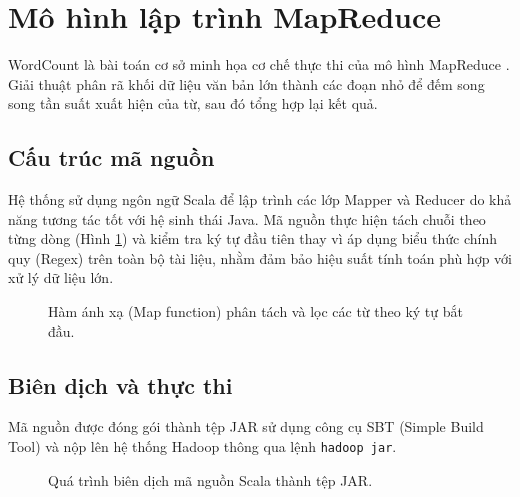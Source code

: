 \section{Mô hình lập trình MapReduce}

WordCount là bài toán cơ sở minh họa cơ chế thực thi của mô hình MapReduce \cite{dean2004mapreduce}. Giải thuật phân rã khối dữ liệu văn bản lớn thành các đoạn nhỏ để đếm song song tần suất xuất hiện của từ, sau đó tổng hợp lại kết quả.

\subsection{Cấu trúc mã nguồn}
Hệ thống sử dụng ngôn ngữ Scala để lập trình các lớp Mapper và Reducer do khả năng tương tác tốt với hệ sinh thái Java. Mã nguồn thực hiện tách chuỗi theo từng dòng (Hình \ref{fig:scala_code}) và kiểm tra ký tự đầu tiên thay vì áp dụng biểu thức chính quy (Regex) trên toàn bộ tài liệu, nhằm đảm bảo hiệu suất tính toán phù hợp với xử lý dữ liệu lớn.

\begin{figure}[H]
    \centering
    \caption{Hàm ánh xạ (Map function) phân tách và lọc các từ theo ký tự bắt đầu.}
    \label{fig:scala_code}
\end{figure}

\subsection{Biên dịch và thực thi}
Mã nguồn được đóng gói thành tệp JAR sử dụng công cụ SBT (Simple Build Tool) và nộp lên hệ thống Hadoop thông qua lệnh \texttt{hadoop jar}.

\begin{figure}[H]
    \centering
    \caption{Quá trình biên dịch mã nguồn Scala thành tệp JAR.}
    \label{fig:sbt_build}
\end{figure}

